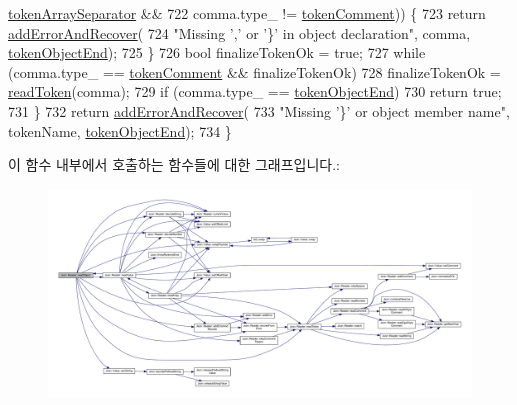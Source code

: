 \begin{DoxyCode}
      \hyperlink{class_json_1_1_reader_aa35e6ab574dc399a0a645ad98ed66bc9af2c235e8da86f11ffb1a1243e49ed1fa}{tokenArraySeparator} &&
722          comma.type\_ != \hyperlink{class_json_1_1_reader_aa35e6ab574dc399a0a645ad98ed66bc9ae4fcf05c3b1ce462bacd34af0ccac32b}{tokenComment})) \{
723       \textcolor{keywordflow}{return} \hyperlink{class_json_1_1_reader_a478db8ac6d00db1409608a37b66bc38d}{addErrorAndRecover}(
724           \textcolor{stringliteral}{"Missing ',' or '\}' in object declaration"}, comma, \hyperlink{class_json_1_1_reader_aa35e6ab574dc399a0a645ad98ed66bc9a12d03a3a710b2d3f1384889df3da887d}{tokenObjectEnd});
725     \}
726     \textcolor{keywordtype}{bool} finalizeTokenOk = \textcolor{keyword}{true};
727     \textcolor{keywordflow}{while} (comma.type\_ == \hyperlink{class_json_1_1_reader_aa35e6ab574dc399a0a645ad98ed66bc9ae4fcf05c3b1ce462bacd34af0ccac32b}{tokenComment} && finalizeTokenOk)
728       finalizeTokenOk = \hyperlink{class_json_1_1_reader_a7cb0631963cc0fd4ff6ed0f570976864}{readToken}(comma);
729     \textcolor{keywordflow}{if} (comma.type\_ == \hyperlink{class_json_1_1_reader_aa35e6ab574dc399a0a645ad98ed66bc9a12d03a3a710b2d3f1384889df3da887d}{tokenObjectEnd})
730       \textcolor{keywordflow}{return} \textcolor{keyword}{true};
731   \}
732   \textcolor{keywordflow}{return} \hyperlink{class_json_1_1_reader_a478db8ac6d00db1409608a37b66bc38d}{addErrorAndRecover}(
733       \textcolor{stringliteral}{"Missing '\}' or object member name"}, tokenName, \hyperlink{class_json_1_1_reader_aa35e6ab574dc399a0a645ad98ed66bc9a12d03a3a710b2d3f1384889df3da887d}{tokenObjectEnd});
734 \}
\end{DoxyCode}
이 함수 내부에서 호출하는 함수들에 대한 그래프입니다.\+:\nopagebreak
\begin{figure}[H]
\begin{center}
\leavevmode
\includegraphics[width=350pt]{class_json_1_1_reader_a0068eb3d8e86e91f0e4806f60da66b9c_cgraph}
\end{center}
\end{figure}
